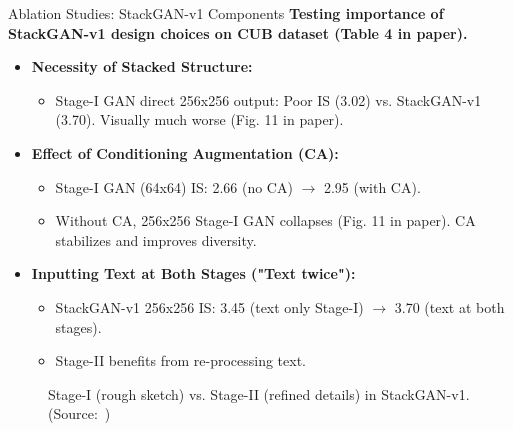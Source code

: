 \documentclass{beamer}
\newcommand{\paperfigure}[3][width=\textwidth]{%
    \begin{figure}%
        \centering%
        \caption{#3 (Source:~\cite{stackgan++})}%
        \label{fig:#2}%
    \end{figure}%
}
\begin{document}
\begin{frame}{Ablation Studies: StackGAN-v1 Components}
    \textbf{Testing importance of StackGAN-v1 design choices on CUB dataset (Table 4 in paper).}
    \begin{itemize}
        \item \textbf{Necessity of Stacked Structure:}
            \begin{itemize}
                \item Stage-I GAN direct 256x256 output: Poor IS (3.02) vs. StackGAN-v1 (3.70). Visually much worse (Fig. 11 in paper).
            \end{itemize}
        \item \textbf{Effect of Conditioning Augmentation (CA):}
            \begin{itemize}
                \item Stage-I GAN (64x64) IS: 2.66 (no CA) $\rightarrow$ 2.95 (with CA).
                \item Without CA, 256x256 Stage-I GAN collapses (Fig. 11 in paper). CA stabilizes and improves diversity.
            \end{itemize}
        \item \textbf{Inputting Text at Both Stages ("Text twice"):}
            \begin{itemize}
                \item StackGAN-v1 256x256 IS: 3.45 (text only Stage-I) $\rightarrow$ 3.70 (text at both stages).
                \item Stage-II benefits from re-processing text.
            \end{itemize}
    \end{itemize}
    \paperfigure[width=0.9\textwidth]{fig10_stage1_vs_stage2}{Stage-I (rough sketch) vs. Stage-II (refined details) in StackGAN-v1.}
\end{frame}
\end{document}
